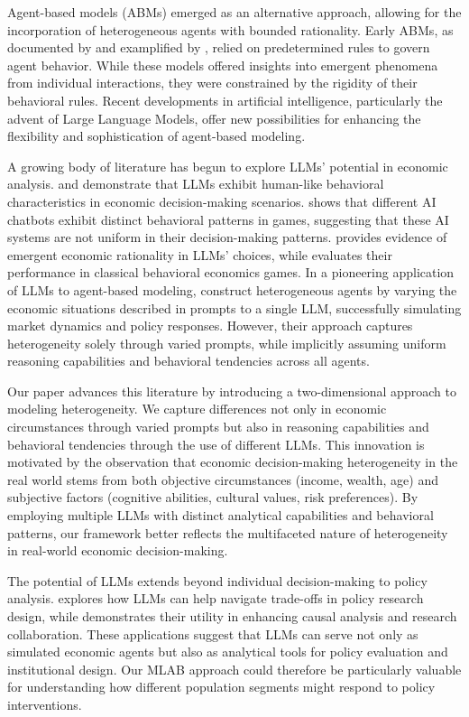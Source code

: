\documentclass[12pt]{article}
\begin{document}
\begin{CJK*}{UTF8}{gbsn}
Agent-based models (ABMs) emerged as an alternative approach, allowing for the incorporation of heterogeneous agents with bounded rationality. Early ABMs, as documented by \cite{tesfatsion2006handbook} and examplified by \cite{brock1998heterogeneous}, relied on predetermined rules to govern agent behavior. While these models offered insights into emergent phenomena from individual interactions, they were constrained by the rigidity of their behavioral rules. Recent developments in artificial intelligence, particularly the advent of Large Language Models, offer new possibilities for enhancing the flexibility and sophistication of agent-based modeling.

A growing body of literature has begun to explore LLMs' potential in economic analysis. \cite{mei2024} and \cite{ma2024} demonstrate that LLMs exhibit human-like behavioral characteristics in economic decision-making scenarios. \cite{xie2024} shows that different AI chatbots exhibit distinct behavioral patterns in games, suggesting that these AI systems are not uniform in their decision-making patterns. \cite{chen2023} provides evidence of emergent economic rationality in LLMs' choices, while \cite{horton2023} evaluates their performance in classical behavioral economics games. In a pioneering application of LLMs to agent-based modeling, \cite{li2024} construct heterogeneous agents by varying the economic situations described in prompts to a single LLM, successfully simulating market dynamics and policy responses. However, their approach captures heterogeneity solely through varied prompts, while implicitly assuming uniform reasoning capabilities and behavioral tendencies across all agents.

Our paper advances this literature by introducing a two-dimensional approach to modeling heterogeneity. We capture differences not only in economic circumstances through varied prompts but also in reasoning capabilities and behavioral tendencies through the use of different LLMs. This innovation is motivated by the observation that economic decision-making heterogeneity in the real world stems from both objective circumstances (income, wealth, age) and subjective factors (cognitive abilities, cultural values, risk preferences). By employing multiple LLMs with distinct analytical capabilities and behavioral patterns, our framework better reflects the multifaceted nature of heterogeneity in real-world economic decision-making.

The potential of LLMs extends beyond individual decision-making to policy analysis. \cite{wu2024} explores how LLMs can help navigate trade-offs in policy research design, while \cite{pang2024} demonstrates their utility in enhancing causal analysis and research collaboration. These applications suggest that LLMs can serve not only as simulated economic agents but also as analytical tools for policy evaluation and institutional design. Our MLAB approach could therefore be particularly valuable for understanding how different population segments might respond to policy interventions.


\end{CJK*}
\end{document}
